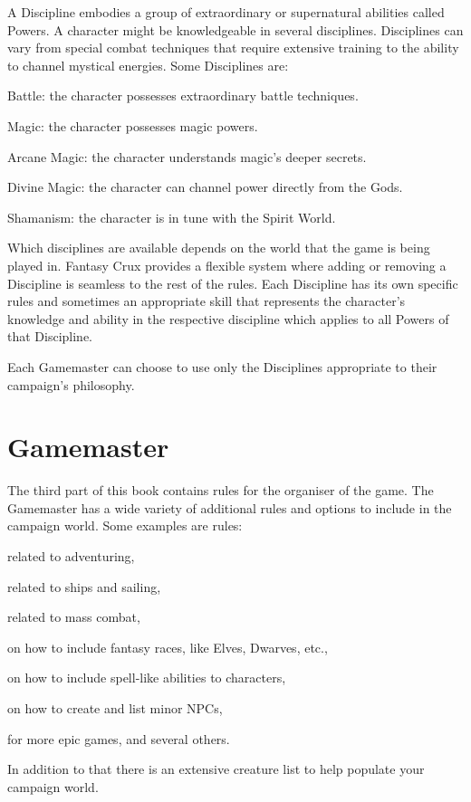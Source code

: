 A Discipline embodies a group of extraordinary or supernatural abilities called Powers. A character might be knowledgeable in several disciplines. Disciplines can vary from special combat techniques that require extensive training to the ability to channel mystical energies. Some Disciplines are:
\begin{rpg-list}
\item Battle: the character possesses extraordinary battle techniques.
\item Magic: the character possesses magic powers.
\item Arcane Magic: the character understands magic's deeper secrets.
\item Divine Magic: the character can channel power directly from the Gods.
\item Shamanism: the character is in tune with the Spirit World.
\end{rpg-list}

Which disciplines are available depends on the world that the game is being played in. Fantasy Crux provides a flexible system where adding or removing a Discipline is seamless to the rest of the rules. Each Discipline has its own specific rules and sometimes an appropriate skill that represents the character's knowledge and ability in the respective discipline which applies to all Powers of that Discipline.

Each Gamemaster can choose to use only the Disciplines appropriate to their campaign's philosophy.


\section{Gamemaster}
The third part of this book contains rules for the organiser of the game. The Gamemaster has a wide variety of additional rules and options to include in the campaign world. Some examples are rules:
\begin{rpg-list}
\item related to adventuring,
\item related to ships and sailing,
\item related to mass combat,
\item on how to include fantasy races, like Elves, Dwarves, etc.,
\item on how to include spell-like abilities to characters,
\item on how to create and list minor NPCs,
\item for more epic games, and several others.
\end{rpg-list}

In addition to that there is an extensive creature list to help populate your campaign world.

